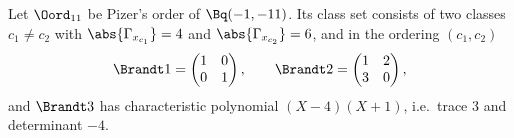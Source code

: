 Let $\Oord_{11}$ be Pizer's order of $\Bq(-1,-11)$. Its class set consists of two classes $c_1\ne c_2$ with $\abs{\Gamma_{x_{c_1}}}=4$ and
$\abs{\Gamma_{x_{c_2}}}=6$, and in the ordering $(c_1,c_2)$
\[
  \Brandt1=\begin{pmatrix}1&0\\0&1\end{pmatrix},\qquad\Brandt2=\begin{pmatrix}1&2\\3&0\end{pmatrix},
\]
and $\Brandt3$ has characteristic polynomial $(X-4)(X+1)$, i.e.\ trace $3$ and determinant $-4$.
